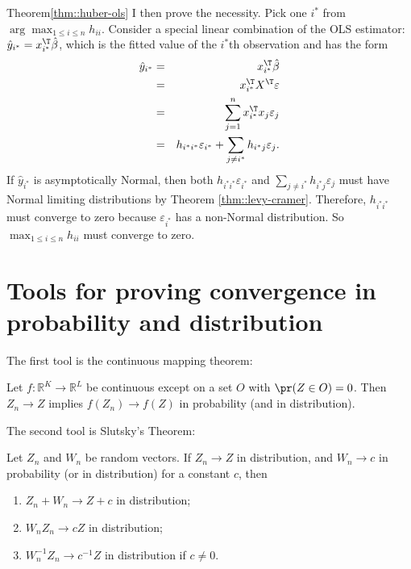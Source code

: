 \begin{myproof}{Theorem}{\ref{thm::huber-ols}}
I then prove the necessity. 
Pick one $i^*$ from $ \arg\max_{1\leq i\leq n}  h_{ii} $. 
Consider a special linear combination of the OLS estimator: $\hat{y}_{i^*} = x_{i^*}^{\T} \hat{\beta}$, which is the fitted value of the $i^*$th observation and has the form
\begin{eqnarray*}
\hat{y}_{i^*}   
&=&  x_{i^*}^{\T} \hat \beta  \\
&=&  x_{i^*}^{\T} X^{\T} \varepsilon \\
&=& \sum_{j=1}^n x_{i^*}^{\T} x_j \varepsilon_j \\
&=&  h_{i^*i^*} \varepsilon_{i^*} + \sum_{j\neq i^*} h_{i^*j} \varepsilon_j . 
\end{eqnarray*}
If $\hat{y}_{i^*} $ is asymptotically Normal, then both $ h_{i^*i^*} \varepsilon_{i^*} $ and $\sum_{j\neq i^*} h_{i^*j} \varepsilon_j$ must have Normal limiting distributions by Theorem \ref{thm::levy-cramer}. Therefore, $ h_{i^*i^*} $ must converge to zero because $\varepsilon_{i^*} $ has a non-Normal distribution. So $\max_{1\leq i \leq n} h_{ii}$ must converge to zero. 
\end{myproof}



\section{Tools for proving convergence in probability and distribution}

The first tool is the continuous mapping theorem:
\begin{proposition}
Let $f:\mathbb{R}^{K}\rightarrow\mathbb{R}^{L}$ be continuous except
on a set $O$ with $\pr(Z\in O)=0$. Then $Z_{n}\rightarrow Z$ implies
$f(Z_{n})\rightarrow f(Z)$ in probability (and in distribution).
\end{proposition}


The second tool is Slutsky's Theorem:
\begin{proposition}
Let $Z_{n}$ and $W_{n}$ be random vectors. If $Z_{n}\rightarrow Z$
in distribution, and $W_{n}\rightarrow c$ in probability (or in distribution)
for a constant $c$, then
\begin{enumerate}
\item $Z_{n}+W_{n}\rightarrow Z+c$ in distribution;
\item $W_{n}Z_{n}\rightarrow cZ$ in distribution;
\item $W_{n}^{-1} Z_{n}\rightarrow c^{-1}Z$ in distribution if $c\neq0$.
\end{enumerate}
\end{proposition}


